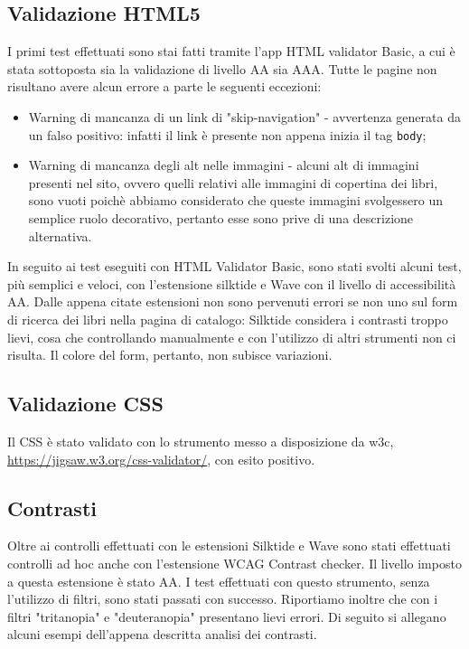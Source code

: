 \documentclass{article}
\begin{document}
\subsection{Validazione HTML5}
I primi test effettuati sono stai fatti tramite l'app HTML validator Basic, a cui è stata sottoposta sia la validazione di livello AA sia AAA. Tutte le pagine non risultano avere alcun errore a parte le seguenti eccezioni:
\begin{itemize}
    \item Warning di mancanza di un link di "skip-navigation" - avvertenza generata da un falso positivo: infatti il link è presente non appena inizia il tag \texttt{body};
    \item Warning di mancanza degli alt nelle immagini - alcuni alt di immagini presenti nel sito, ovvero quelli relativi alle immagini di copertina dei libri, sono vuoti poichè abbiamo considerato che queste immagini svolgessero un semplice ruolo decorativo, pertanto esse sono prive di una descrizione alternativa.
\end{itemize}

In seguito ai test eseguiti con HTML Validator Basic, sono stati svolti alcuni test, più semplici e veloci, con l'estensione silktide e Wave con il livello di accessibilità AA. Dalle appena citate estensioni non sono pervenuti errori se non uno sul form di ricerca dei libri nella pagina di catalogo: Silktide considera i contrasti troppo lievi, cosa che controllando manualmente e con l'utilizzo di altri strumenti non ci risulta. Il colore del form, pertanto, non subisce variazioni.

\subsection{Validazione CSS}
Il CSS è stato validato con lo strumento messo a disposizione da w3c, \url{https://jigsaw.w3.org/css-validator/}, con esito positivo.

\subsection{Contrasti}
Oltre ai controlli effettuati con le estensioni Silktide e Wave sono stati effettuati controlli ad hoc anche con l'estensione WCAG Contrast checker. Il livello imposto a questa estensione è stato AA. I test effettuati con questo strumento, senza l'utilizzo di filtri, sono stati passati con successo. Riportiamo inoltre che con i filtri "tritanopia" e "deuteranopia" presentano lievi errori. Di seguito si allegano alcuni esempi dell'appena descritta analisi dei contrasti.
\end{document}
